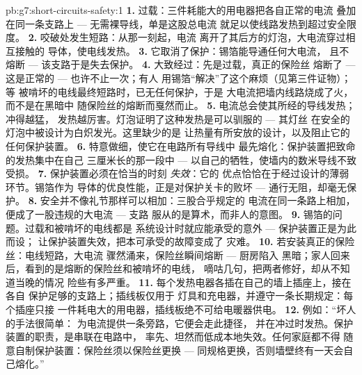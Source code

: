 \begin{solution}{pb:g7:short-circuits-safety:1}
\textbf{1.} 过载：三件耗能大的用电器把各自正常的电流
叠加在同一条支路上 --- 无需裸导线，单是这股总电流
就足以使线路发热到超过安全限度。
\textbf{2.} 咬破处发生短路：从那一刻起，电流
离开了其后方的灯泡，大电流穿过相互接触的
导体，使电线发热。
\textbf{3.} 它取消了保护：锡箔能导通任何大电流，
且不熔断 --- 该支路于是失去保护。
\textbf{4.} 大致经过：先是过载，真正的保险丝
熔断了 --- 这是正常的 --- 也许不止一次；有人
用锡箔“解决”了这个麻烦（见第三件证物）；等
被啃坏的电线最终短路时，已无任何保护，于是
大电流把墙内线路烧成了火，而不是在黑暗中
随保险丝的熔断而戛然而止。
\textbf{5.} 电流总会使其所经的导线发热；冲得越猛，
发热越厉害。灯泡证明了这种发热是可以驯服的 --- 其灯丝
在安全的灯泡中被设计为白炽发光。这里缺少的是
让热量有所安放的设计，以及阻止它的任何保护装置。
\textbf{6.} 特意做细，使它在电路所有导线中
最先熔化：保护装置把致命的发热集中在自己
三厘米长的那一段中 --- 以自己的牺牲，使墙内的数米导线不致受损。
\textbf{7.} 保护装置必须在恰当的时刻 \emph{失效}：它的
优点恰恰在于经过设计的薄弱环节。锡箔作为
导体的优良性能，正是对保护关卡的败坏 ---
通行无阻，却毫无保护。
\textbf{8.} 安全并不像礼节那样可以相加：三股合乎规定的
电流在同一条路上相加，便成了一股违规的大电流 --- 支路
服从的是算术，而非人的意图。
\textbf{9.} 锡箔的问题。过载和被啃坏的电线都是
系统设计时就应能承受的意外 --- 保护装置正是为此而设；
让保护装置失效，把本可承受的故障变成了
灾难。
\textbf{10.} 若安装真正的保险丝：电线短路，大电流
骤然涌来，保险丝瞬间熔断 --- 厨房陷入
黑暗；家人回来后，看到的是熔断的保险丝和被啃坏的电线，
嘀咕几句，把两者修好，却从不知道当晚的情况
险些有多严重。
\textbf{11.} 每个发热电器各插在自己的墙上插座上，接在各自
保护足够的支路上；插线板仅用于
灯具和充电器，并遵守一条长期规定：每个插座只接
一件耗电大的用电器，插线板绝不可给电暖器供电。
\textbf{12.} 例如：“坏人的手法很简单：
为电流提供一条旁路，它便会走此捷径，
并在冲过时发热。保护装置的职责，是串联在电路中，
率先、坦然而低成本地失效。任何家庭都不得
随意自制保护装置：保险丝须以保险丝更换 ---
同规格更换，否则墙壁终有一天会自己熔化。”
\end{solution}
